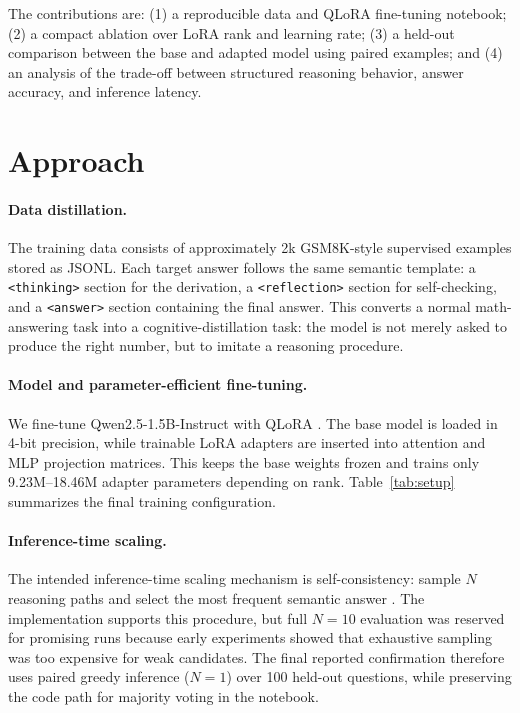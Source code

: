 \documentclass{article}
\begin{document}
The contributions are: (1) a reproducible data and QLoRA fine-tuning notebook; (2) a compact ablation over LoRA rank and learning rate; (3) a held-out comparison between the base and adapted model using paired examples; and (4) an analysis of the trade-off between structured reasoning behavior, answer accuracy, and inference latency.

\section{Approach}
\paragraph{Data distillation.}
The training data consists of approximately 2k GSM8K-style supervised examples stored as JSONL. Each target answer follows the same semantic template: a \texttt{<thinking>} section for the derivation, a \texttt{<reflection>} section for self-checking, and a \texttt{<answer>} section containing the final answer. This converts a normal math-answering task into a cognitive-distillation task: the model is not merely asked to produce the right number, but to imitate a reasoning procedure.

\paragraph{Model and parameter-efficient fine-tuning.}
We fine-tune Qwen2.5-1.5B-Instruct with QLoRA \citep{dettmers2023qlora}. The base model is loaded in 4-bit precision, while trainable LoRA adapters are inserted into attention and MLP projection matrices. This keeps the base weights frozen and trains only 9.23M--18.46M adapter parameters depending on rank. Table~\ref{tab:setup} summarizes the final training configuration.

\begin{table}[t]
\centering
\caption{Main training setup for the Qwen2.5-1.5B ablation.}
\label{tab:setup}
\resizebox{0.92\linewidth}{!}{}
\end{table}

\paragraph{Inference-time scaling.}
The intended inference-time scaling mechanism is self-consistency: sample $N$ reasoning paths and select the most frequent semantic answer \citep{wang2022selfconsistency}. The implementation supports this procedure, but full $N=10$ evaluation was reserved for promising runs because early experiments showed that exhaustive sampling was too expensive for weak candidates. The final reported confirmation therefore uses paired greedy inference ($N=1$) over 100 held-out questions, while preserving the code path for majority voting in the notebook.
\end{document}

